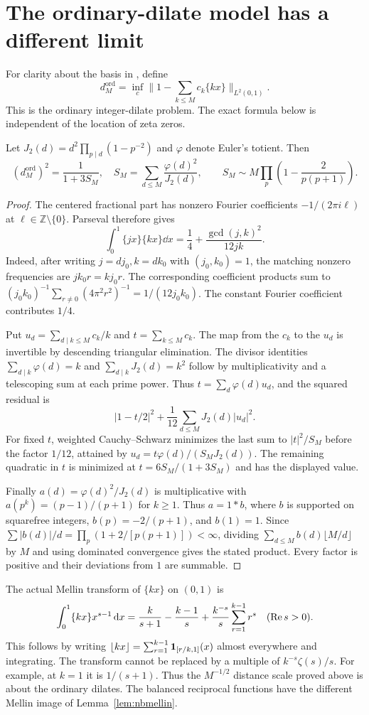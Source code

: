 \section{The ordinary-dilate model has a different limit}\label{sec:ordinary}

For clarity about the basis in \cite{nbdraft}, define
\[
 d^{\mathrm{ord}}_M=\inf_c\Big\|1-\sum_{k\le M}c_k\{kx\}\Big\|_{L^2(0,1)}.
\]
This is the ordinary integer-dilate problem. The exact formula below is independent of the location of zeta zeros.

\begin{proposition}
Let \(J_2(d)=d^2\prod_{p\mid d}(1-p^{-2})\) and \(\varphi\) denote Euler's totient. Then
\[
 (d_M^{\mathrm{ord}})^2=\frac{1}{1+3S_M},
 \quad S_M=\sum_{d\le M}\frac{\varphi(d)^2}{J_2(d)},\qquad
 S_M\sim M\prod_p\left(1-\frac{2}{p(p+1)}\right).
\]
\end{proposition}
\begin{proof}
The centered fractional part has nonzero Fourier coefficients \(-1/(2\pi i \ell)\) at \(\ell\in\mathbb Z\setminus\{0\}\). Parseval therefore gives
\[
 \int_0^1\{jx\}\{kx\}\dd x=\frac14+\frac{\gcd(j,k)^2}{12jk}.
\]
Indeed, after writing \(j=dj_0,k=dk_0\) with \((j_0,k_0)=1\), the matching nonzero frequencies are \(j k_0 r=k j_0 r\). The corresponding coefficient products sum to \((j_0k_0)^{-1}\sum_{r\ne0}(4\pi^2r^2)^{-1}=1/(12j_0k_0)\). The constant Fourier coefficient contributes \(1/4\).

Put \(u_d=\sum_{d\mid k\le M}c_k/k\) and \(t=\sum_{k\le M}c_k\). The map from the \(c_k\) to the \(u_d\) is invertible by descending triangular elimination. The divisor identities \(\sum_{d\mid k}\varphi(d)=k\) and \(\sum_{d\mid k}J_2(d)=k^2\) follow by multiplicativity and a telescoping sum at each prime power. Thus \(t=\sum_d\varphi(d)u_d\), and the squared residual is
\[
 |1-t/2|^2+\frac{1}{12}\sum_{d\le M}J_2(d)|u_d|^2.
\]
For fixed \(t\), weighted Cauchy--Schwarz minimizes the last sum to \(|t|^2/S_M\) before the factor \(1/12\), attained by \(u_d=t\varphi(d)/(S_MJ_2(d))\). The remaining quadratic in \(t\) is minimized at \(t=6S_M/(1+3S_M)\) and has the displayed value.

Finally \(a(d)=\varphi(d)^2/J_2(d)\) is multiplicative with \(a(p^k)=(p-1)/(p+1)\) for \(k\ge1\). Thus \(a=1*b\), where \(b\) is supported on squarefree integers, \(b(p)=-2/(p+1)\), and \(b(1)=1\). Since \(\sum|b(d)|/d=\prod_p(1+2/[p(p+1)])<\infty\), dividing \(\sum_{d\le M}b(d)\lfloor M/d\rfloor\) by \(M\) and using dominated convergence gives the stated product. Every factor is positive and their deviations from \(1\) are summable.
\end{proof}

The actual Mellin transform of \(\{kx\}\) on \((0,1)\) is
\[
 \int_0^1 \{kx\}x^{s-1}\,\mathrm d x
 =\frac{k}{s+1}-\frac{k-1}{s}+\frac{k^{-s}}s\sum_{r=1}^{k-1}r^s
 \quad(\operatorname{Re} s>0).
\]
This follows by writing \(\lfloor kx\rfloor=\sum_{r=1}^{k-1}\mathbf 1_{[r/k,1]}(x)\) almost everywhere and integrating. The transform cannot be replaced by a multiple of \(k^{-s}\zeta(s)/s\). For example, at \(k=1\) it is \(1/(s+1)\). Thus the \(M^{-1/2}\) distance scale proved above is about the ordinary dilates. The balanced reciprocal functions have the different Mellin image of Lemma~\ref{lem:nbmellin}.
